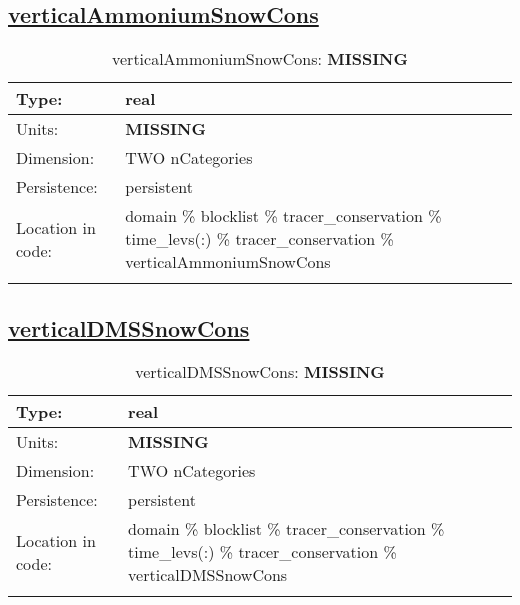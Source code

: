\subsection[verticalAmmoniumSnowCons]{\hyperref[sec:var_tab_tracer_conservation]{verticalAmmoniumSnowCons}}
\label{subsec:var_sec_tracer_conservation_verticalAmmoniumSnowCons}
\begin{center}
\begin{longtable}{| p{2.0in} | p{4.0in} |}
        \hline 
        Type: & real \\
        \hline 
        Units: & {\bf \color{red} MISSING} \\
        \hline 
        Dimension: & TWO nCategories \\
        \hline 
        Persistence: & persistent \\
        \hline 
         Location in code: & domain \% blocklist \% tracer\_conservation \% time\_levs(:) \% tracer\_conservation \% verticalAmmoniumSnowCons \\
         \hline 
    \caption{verticalAmmoniumSnowCons: {\bf \color{red} MISSING}}
\end{longtable}
\end{center}
\subsection[verticalDMSSnowCons]{\hyperref[sec:var_tab_tracer_conservation]{verticalDMSSnowCons}}
\label{subsec:var_sec_tracer_conservation_verticalDMSSnowCons}
\begin{center}
\begin{longtable}{| p{2.0in} | p{4.0in} |}
        \hline 
        Type: & real \\
        \hline 
        Units: & {\bf \color{red} MISSING} \\
        \hline 
        Dimension: & TWO nCategories \\
        \hline 
        Persistence: & persistent \\
        \hline 
         Location in code: & domain \% blocklist \% tracer\_conservation \% time\_levs(:) \% tracer\_conservation \% verticalDMSSnowCons \\
         \hline 
    \caption{verticalDMSSnowCons: {\bf \color{red} MISSING}}
\end{longtable}
\end{center}
